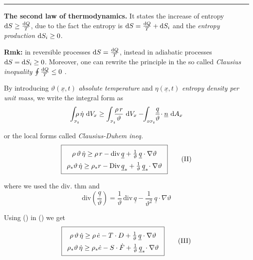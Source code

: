 \rule{0.31\textwidth}{0.2pt}
\smallskip

\textbf{The second law of thermodynamics.} It states the increase of entropy $\mathrm{d} S\geq\frac{\mathrm{d} Q}{T}$, due to the fact the entropy is $\mathrm{d} S=\frac{\mathrm{d} Q}{T}+\mathrm{d} S_{i}$ and the \emph{entropy production} $\mathrm{d} S_{i}\geq 0$.

\smallskip

\textbf{Rmk:} in reversible processes $\mathrm{d} S=\frac{\mathrm{d} Q}{T}$, instead in adiabatic processes $\mathrm{d} S=\mathrm{d} S_{i}\geq 0$. Moreover, one can rewrite the principle in the so called \emph{Clausius inequality} $\oint \frac{\mathrm{d} Q}{T} \leq 0$ .

\smallskip

By introducing $\vartheta(\underline{x},t)$ \emph{absolute temperature} and $\eta(\underline{x},t)$ \emph{entropy density per unit mass}, we write the integral form as
\begin{equation*}
\int_{_{\pt_t}}\!\!\!\!\! \rho\,\dot{\eta}\ \de V_x \geq
\int_{_{\pt_t}}\!\!\! \frac{\rho\,r}{\vartheta}\ \de V_x -\!\! 
\int_{_{\partial\pt_t}}\!\! \frac{\underline{q}}{\vartheta}\!\cdot \underline{n}\ \de A_x
\end{equation*}

or the local forms called \emph{Clausius-Duhem ineq.}
\begin{equation*}
\boxed{
{\renewcommand*{\arraystretch}{1.5}
\begin{array}{c}
\rho\,\theta\,\dot{\eta}\geq\rho\,r-\text{div}\,\underline{q}+\frac{1}{\vartheta}\,\underline{q}\cdot\nabla\vartheta \\
\rho_*\theta\,\dot{\eta}\geq\rho_*r-\text{Div}\,\underline{q}_*+\frac{1}{\vartheta}\,\underline{q}_*\!\cdot\nabla\vartheta
\end{array}}
} \tag{\RNum{2}}
\end{equation*}

where we used the div. thm and 
\begin{equation*}
\text{div}\left(\frac{\underline{q}}{\vartheta}\right)=\frac{1}{\vartheta}\,\text{div}\,\underline{q}-\frac{1}{\vartheta^2}\ \underline{q}\cdot\nabla \vartheta
\end{equation*}

Using () in () we get
\begin{equation*}
\boxed{
{\renewcommand*{\arraystretch}{1.5}
\begin{array}{c}
\rho\,\theta\,\dot{\eta}\geq\rho\,\dot{e}-T\cdot D+\frac{1}{\vartheta}\,\underline{q}\cdot\nabla\vartheta \\
\rho_*\theta\,\dot{\eta}\geq\rho_*\dot{e}-S\cdot\dot{F}+\frac{1}{\vartheta}\,\underline{q}_*\!\cdot\nabla\vartheta
\end{array}}
} \tag{\RNum{3}}
\end{equation*}

